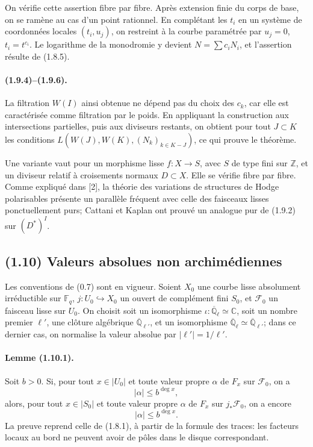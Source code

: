 \documentclass[11pt]{article}
\theoremstyle{remark}
\newcommand{\Qlb}{\overline{\mathbb{Q}}_\ell}
\newcommand{\ZZ}{\mathbb{Z}}
\newcommand{\QQ}{\mathbb{Q}}
\newcommand{\CC}{\mathbb{C}}
\newcommand{\Fq}{\mathbb{F}_q}
\begin{document}
On vérifie cette assertion fibre par fibre. Après extension finie du corps de base, on se ramène au cas d'un point rationnel. En complétant les \(t_i\) en un système de coordonnées locales \((t_i,u_j)\), on restreint à la courbe paramétrée par \(u_j=0\), \(t_i=t^{c_i}\). Le logarithme de la monodromie y devient \(N=\sum c_iN_i\), et l'assertion résulte de (1.8.5).

\paragraph{(1.9.4)--(1.9.6).}
La filtration \(W(I)\) ainsi obtenue ne dépend pas du choix des \(c_k\), car elle est caractérisée comme filtration par le poids. En appliquant la construction aux intersections partielles, puis aux diviseurs restants, on obtient pour tout \(J\subset K\) les conditions \(L(W(J),W(K),(N_k)_{k\in K-J})\), ce qui prouve le théorème.

Une variante vaut pour un morphisme lisse \(f:X\to S\), avec \(S\) de type fini sur \(\ZZ\), et un diviseur relatif à croisements normaux \(D\subset X\). Elle se vérifie fibre par fibre. Comme expliqué dans [2], la théorie des variations de structures de Hodge polarisables présente un parallèle fréquent avec celle des faisceaux lisses ponctuellement purs; Cattani et Kaplan ont prouvé un analogue pur de (1.9.2) sur \((D^*)^I\).

\subsection*{(1.10) Valeurs absolues non archimédiennes}

Les conventions de (0.7) sont en vigueur. Soient \(X_0\) une courbe lisse absolument irréductible sur \(\Fq\), \(j:U_0\hookrightarrow X_0\) un ouvert de complément fini \(S_0\), et \(\mathcal F_0\) un faisceau lisse sur \(U_0\). On choisit soit un isomorphisme \(\iota:\Qlb\simeq\CC\), soit un nombre premier \(\ell'\), une clôture algébrique \(\overline{\QQ}_{\ell'}\), et un isomorphisme \(\Qlb\simeq\overline{\QQ}_{\ell'}\); dans ce dernier cas, on normalise la valeur absolue par \(|\ell'|=1/\ell'\).

\paragraph{Lemme (1.10.1).}
Soit \(b>0\). Si, pour tout \(x\in|U_0|\) et toute valeur propre \(\alpha\) de \(F_x\) sur \(\mathcal F_0\), on a
\[
|\alpha|\le b^{\deg x},
\]
alors, pour tout \(x\in|S_0|\) et toute valeur propre \(\alpha\) de \(F_x\) sur \(j_*\mathcal F_0\), on a encore
\[
|\alpha|\le b^{\deg x}.
\]
La preuve reprend celle de (1.8.1), à partir de la formule des traces: les facteurs locaux au bord ne peuvent avoir de pôles dans le disque correspondant.
\end{document}

